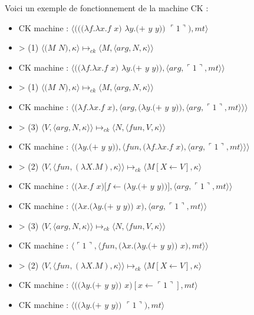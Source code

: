 \documentclass[10pt,a4paper]{report}
\begin{document}
Voici un exemple de fonctionnement de la machine CK :

\begin{itemize}
\item[] CK machine : $\langle(((\lambda f.\lambda x.f$ $x)$ $\lambda y.(+$ $y$ $y))$ $\ulcorner 1\urcorner),mt\rangle$
\item[] > (1) $\langle(M$ $N),\kappa\rangle \longmapsto_{ck} \langle M,\langle arg,N,\kappa\rangle\rangle$
\item[] CK machine : $\langle((\lambda f.\lambda x.f$ $x)$ $\lambda y.(+$ $y$ $y)),\langle arg,\ulcorner 1\urcorner,mt\rangle\rangle$
\item[] > (1) $\langle(M$ $N),\kappa\rangle \longmapsto_{ck} \langle M,\langle arg,N,\kappa\rangle\rangle$
\item[] CK machine : $\langle(\lambda f.\lambda x.f$ $x),\langle arg,(\lambda y.(+$ $y$ $y)),\langle arg,\ulcorner 1\urcorner,mt\rangle\rangle\rangle$	
\item[] > (3) $\langle V,\langle arg,N,\kappa \rangle \rangle \longmapsto_{ck} \langle N,\langle fun,V,\kappa \rangle \rangle$
\item[] CK machine : $\langle(\lambda y.(+$ $y$ $y)),\langle fun,(\lambda f.\lambda x.f$ $x),\langle arg,\ulcorner 1\urcorner,mt\rangle\rangle\rangle$	
\item[] > (2) $\langle V,\langle fun,(\lambda X.M),\kappa \rangle \rangle \longmapsto_{ck} \langle M[X \leftarrow V],\kappa\rangle$
\item[] CK machine : $\langle(\lambda x.f$ $x)[f\leftarrow(\lambda y.(+$ $y$ $y))],\langle arg,\ulcorner 1\urcorner,mt\rangle\rangle$	
\item[] CK machine : $\langle(\lambda x.(\lambda y.(+$ $y$ $y))$ $x),\langle arg,\ulcorner 1\urcorner,mt\rangle\rangle$	
\item[] > (3) $\langle V,\langle arg,N,\kappa \rangle \rangle \longmapsto_{ck} \langle N,\langle fun,V,\kappa \rangle \rangle$
\item[] CK machine : $\langle\ulcorner 1\urcorner,\langle fun,(\lambda x.(\lambda y.(+$ $y$ $y))$ $x),mt\rangle\rangle$
\item[] > (2) $\langle V,\langle fun,(\lambda X.M),\kappa \rangle \rangle \longmapsto_{ck} \langle M[X \leftarrow V],\kappa\rangle$		
\item[] CK machine : $\langle((\lambda y.(+$ $y$ $y))$ $x)[x \leftarrow \ulcorner 1\urcorner ],mt\rangle$
\item[] CK machine : $\langle((\lambda y.(+$ $y$ $y))$ $\ulcorner 1\urcorner),mt\rangle$

\end{itemize}
\end{document}
